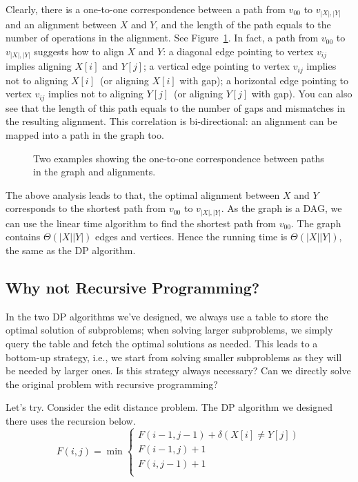Clearly, there is a one-to-one correspondence between a path from $v_{00}$ to $v_{|X|,|Y|}$
and an alignment between $X$ and $Y$, and the length of the path equals to the
number of operations in the alignment. 
See Figure~\ref{fig:graph2}.
In fact, a path from $v_{00}$ to $v_{|X|,|Y|}$
suggests how to align $X$ and $Y$: a diagonal edge pointing to vertex $v_{ij}$ implies aligning $X[i]$ and $Y[j]$;
a vertical edge pointing to vertex $v_{ij}$ implies not to aligning $X[i]$~(or aligning $X[i]$ with gap);
a horizontal edge pointing to vertex $v_{ij}$ implies not to aligning $Y[j]$~(or aligning $Y[j]$ with gap).
You can also see that the length of this path equals to the number of 
gaps and mismatches in the resulting alignment. This correlation is bi-directional:
an alignment can be mapped into a path in the graph too.


\begin{figure}[h!]
\centering{}
\caption{Two examples showing the one-to-one correspondence between paths in the graph and alignments.}
\label{fig:graph2}
\end{figure}

The above analysis leads to that, the optimal alignment between $X$ and $Y$
corresponds to the shortest path from  $v_{00}$ to $v_{|X|,|Y|}$.
As the graph is a DAG, we can use the linear time algorithm to find the shortest path from $v_{00}$.
The graph contains $\Theta(|X||Y|)$ edges and vertices.
Hence the running time is $\Theta(|X||Y|)$,
the same as the DP algorithm.


\subsection*{Why not Recursive Programming?}

In the two DP algorithms we've designed, we always use a table to store
the optimal solution of subproblems; when solving larger
subproblems, we simply query the table and fetch the optimal
solutions as needed. 
This leads to a bottom-up strategy, i.e., we start from solving
smaller subproblems as they will be needed by larger ones.
Is this strategy always necessary?
Can we directly solve the original problem with recursive programming?

Let's try.
Consider the edit distance problem.
The DP algorithm we designed there uses the recursion below.
\begin{displaymath}
F(i,j) = \min\left\{
	\begin{array}{llll}
	F(i-1,j-1) + \delta(X[i] \neq Y[j]) \\
	F(i-1,j) + 1 \\
	F(i,j-1) + 1 \\
	\end{array}
\right.
\end{displaymath}

